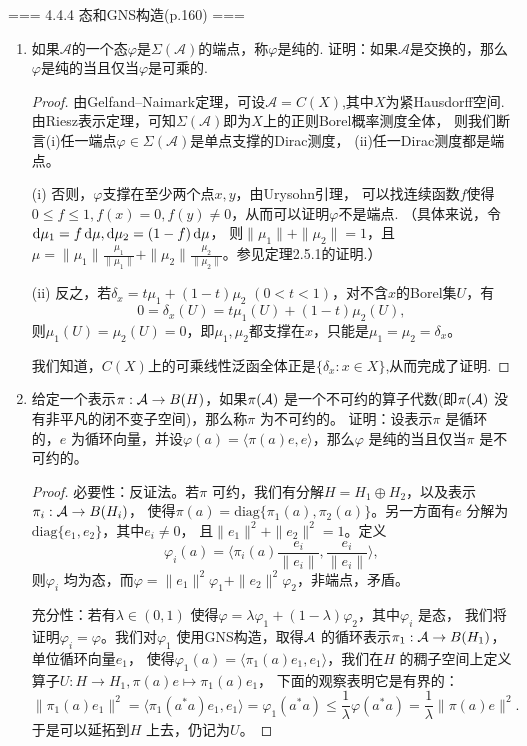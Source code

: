 === 4.4.4 态和GNS构造(p.160) ===
\begin{enumerate}
\item[1]
如果$\mathscr{A}$的一个态$\varphi$是$\varSigma(\mathscr{A})$的端点，称$\varphi$是纯的.
证明：如果$\mathscr{A}$是交换的，那么$\varphi$是纯的当且仅当$\varphi$是可乘的.
\begin{proof}
由Gelfand--Naimark定理，可设$\mathscr{A}=C(X)$,其中$X$为紧Hausdorff空间.
由Riesz表示定理，可知$\varSigma(\mathscr{A})$即为$X$上的正则Borel概率测度全体，
则我们断言(i)任一端点$\varphi\in \varSigma(\mathscr{A})$是单点支撑的Dirac测度，
(ii)任一Dirac测度都是端点。

(i) 否则，$\varphi$支撑在至少两个点$x,y$，由Urysohn引理，
可以找连续函数$f$使得$0 \leqslant f \leqslant 1,f(x)=0,f(y)\ne0$，从而可以证明$\varphi$不是端点.
（具体来说，令${\rm d}\mu_1=f\,{\rm d}\mu,{\rm d}\mu_2=(1-f)\,{\rm d}\mu$，
则$\|\mu_1\|+\|\mu_2\|=1$，且$\mu=\|\mu_1\|\frac{\mu_1}{\|\mu_1\|}+\|\mu_2\|\frac{\mu_2}{\|\mu_2\|}$。参见定理2.5.1的证明.）

(ii) 反之，若$\delta_x=t\mu_1+(1-t)\mu_2$ $(0<t<1)$，对不含$x$的Borel集$U$，有
\[0=\delta_x(U)=t\mu_1(U)+(1-t)\mu_2(U),\]
则$\mu_1(U)=\mu_2(U)=0$，即$\mu_1,\mu_2$都支撑在$x$，只能是$\mu_1=\mu_2=\delta_x$。

我们知道，$C(X)$上的可乘线性泛函全体正是$\{\delta_x:x\in X\}$,从而完成了证明.
\end{proof}

\item[2]
给定一个表示$ \pi: \mathcal{A} \to B(H) $，如果$ \pi(\mathcal{A}) $ 是一个不可约的算子代数(即$ \pi(\mathcal{A}) $ 没有非平凡的闭不变子空间)，那么称$ \pi $ 为不可约的。
证明：设表示$ \pi $ 是循环的，$ e $ 为循环向量，并设$ \varphi(a) = \langle \pi(a)e,e \rangle  $，那么$ \varphi $ 是纯的当且仅当$ \pi $ 是不可约的。

\begin{proof}
    必要性：反证法。若$ \pi $ 可约，我们有分解$ H = H_{1}\oplus H_{2} $，以及表示$ \pi_{i}: \mathcal{A} \to B(H_{i}) $，
    使得$ \pi(a) = \mathrm{diag}\{\pi_{1}(a),\pi_{2}(a)\} $。另一方面有$ e $ 分解为$ \mathrm{diag}\{e_{1},e_{2}\} $，其中$ e_{i}\ne0 $，
    且$ \| e_{1} \|^{2} + \| e_{2} \|^{2} = 1 $。定义
    $$
     \varphi_{i}(a) = \langle \pi_{i}(a)\frac{e_{i}}{\| e_{i} \| }, \frac{e_{i}}{\| e_{i} \| } \rangle,
    $$ 
    则$ \varphi_{i} $ 均为态，而$ \varphi = \| e_{1} \|^{2} \varphi_{1} + \| e_{2} \|^{2}\varphi_{2} $，非端点，矛盾。

    充分性：若有$ \lambda \in (0,1) $ 使得$ \varphi = \lambda \varphi_{1} + (1-\lambda) \varphi_{2} $，其中$ \varphi_{i} $ 是态，
    我们将证明$ \varphi_{i} = \varphi $。我们对$ \varphi_{1} $ 使用GNS构造，取得$ \mathcal{A} $ 的循环表示$ \pi_{1}: \mathcal{A} \to B(H_{1}) $，单位循环向量$ e_{1} $，
    使得$ \varphi_{1}(a) = \langle \pi_{1}(a)e_{1}, e_{1} \rangle  $，我们在$ H $ 的稠子空间上定义算子$ U: H\to H_{1},\pi(a)e \mapsto \pi_{1}(a)e_{1} $，
    下面的观察表明它是有界的：
    $$
     \| \pi_{1}(a)e_{1} \|^{2} = \langle \pi_{1}(a^{*}a)e_{1},e_{1} \rangle = \varphi_{1}(a^{*}a) 
     \leqslant \frac{1}{\lambda}\varphi(a^{*}a) = \frac{1}{\lambda}\| \pi(a)e \|^{2}.
    $$ 
    于是可以延拓到$ H $ 上去，仍记为$ U $。


\end{proof}
\end{enumerate}
